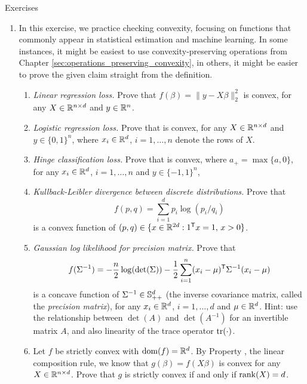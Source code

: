 \begin{xcb}{Exercises}
\begin{enumerate}[label=\thechapter.\arabic*]
\item \label{ex:loss_functions} 
  In this exercise, we practice checking convexity, focusing on functions that 
  commonly appear in statistical estimation and machine learning. In some 
  instances, it might be easiest to use convexity-preserving operations from 
  Chapter \ref{sec:operations_preserving_convexity}, in others, it might be
  easier to prove the given claim straight from the definition.

\begin{enumerate}[label=\alph*.]
\item \emph{Linear regression loss.} Prove that $f(\beta) = \|y -
  X \beta\|_2^2$ is convex, for any $X \in \mathbb{R}^{n \times d}$ and $y \in \mathbb{R}^n$.  

\item \emph{Logistic regression loss.} Prove that  is convex, for any $X \in 
  \mathbb{R}^{n \times d}$ and $y \in \{0,1\}^n$, where $x_i \in \mathbb{R}^d$, $i=1,\ldots,n$  
  denote the rows of $X$.
  
\item \emph{Hinge classification loss.} Prove that  is convex, where $a_+ = \max\{a,
  0\}$, for any $x_i \in \mathbb{R}^d$, $i=1,\ldots,n$ and $y \in \{-1,1\}^n$, 

\item \emph{Kullback-Leibler divergence between discrete distributions.} Prove
  that 
  \[
  f(p,q) = \sum_{i=1}^d p_i \log(p_i / q_i) 
  \]
  is a convex function of $(p,q) \in \{ x \in \mathbb{R}^{2d} : 1^{\mathsf{T}} x = 1, \, x >
  0\}$.

\item \emph{Gaussian log likelihood for precision matrix.} Prove that 
  \[
  f(\Sigma^{-1}) = -\frac{n}{2} \log(\det(\Sigma)) - \frac{1}{2} \sum_{i=1}^n 
  (x_i-\mu)^{\mathsf{T}} \Sigma^{-1} (x_i-\mu)
  \]
  is a concave function of $\Sigma^{-1} \in \mathbb{S}_{++}^d$ (the inverse
  covariance matrix, called the \emph{precision matrix}), for any $x_i \in
  \mathbb{R}^d$, $i=1,\ldots,d$ and $\mu \in \mathbb{R}^d$. Hint: use the relationship between
  $\det(A)$ and $\det(A^{-1})$ for an invertible matrix $A$, and also linearity
  of the trace operator $\operatorname{tr}(\cdot)$. 

\item Let $f$ be strictly convex with $\operatorname{dom}(f)=\mathbb{R}^d$. By Property
  , the linear composition rule, we know that  
  $g(\beta) = f(X \beta)$ is convex for any $X \in \mathbb{R}^{n \times d}$. Prove 
  that $g$ is strictly convex if and only if $\operatorname{rank}(X)=d$. 
\end{enumerate}


\end{enumerate}
\end{xcb}
